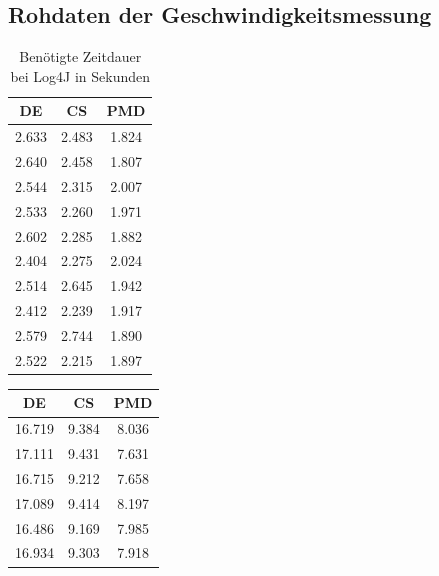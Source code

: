 \begin{appendices}
\chapter{Rohdaten der Geschwindigkeitsmessung}\label{chapter:raw_speed_data}
\begin{table}[]
    \centering
    \begin{tabular}{c|c|c}
DE & CS &PMD\\\hline
2.633 &	2.483&	1.824\\\hline
		
2.640&	2.458&	1.807\\\hline
		
2.544&	2.315&	2.007\\\hline
		
2.533&	2.260&	1.971\\\hline
		
2.602&	2.285&	1.882\\\hline
		
2.404&	2.275&	2.024\\\hline
		
2.514&	2.645&	1.942\\\hline
		
2.412&	2.239&	1.917\\\hline
		
2.579&	2.744&	1.890\\\hline
		
2.522&	2.215&	1.897\\\hline
  \end{tabular}
    \caption{Benötigte Zeitdauer bei Log4J in Sekunden}
    \label{tab:raw_log4j}
\end{table}


\begin{table}[]
    \centering
    \begin{tabular}{c|c|c}
DE & CS &PMD\\\hline

16.719&	9.384&	8.036\\\hline
		
17.111&	9.431&	7.631\\\hline
		
16.715&	9.212&	7.658\\\hline
		
17.089&	9.414&	8.197\\\hline
		
16.486&	9.169&	7.985\\\hline
		
16.934&	9.303&	7.918\\\hline
		

\end{tabular}
\end{table}
\end{appendices}
